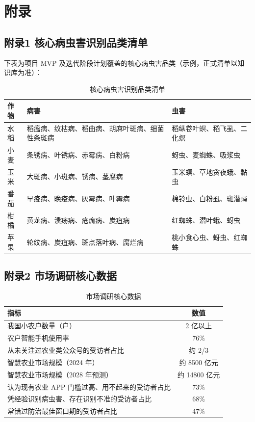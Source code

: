 \chapter*{附录}

\section{附录1 核心病虫害识别品类清单}

下表为项目 MVP 及迭代阶段计划覆盖的核心病虫害品类（示例，正式清单以知识库为准）：

\begin{table}[H]
  \centering
  \small
  \renewcommand{\arraystretch}{1.35}
  \caption{核心病虫害识别品类清单}
  \begin{tabular}{p{2.2cm}p{6.4cm}p{6.4cm}}
    \toprule
    作物 & 病害 & 虫害 \\
    \midrule
    水稻 & 稻瘟病、纹枯病、稻曲病、胡麻叶斑病、细菌性条斑病 & 稻纵卷叶螟、稻飞虱、二化螟 \\
    小麦 & 条锈病、叶锈病、赤霉病、白粉病 & 蚜虫、麦蜘蛛、吸浆虫 \\
    玉米 & 大斑病、小斑病、锈病、茎腐病 & 玉米螟、草地贪夜蛾、黏虫 \\
    番茄 & 早疫病、晚疫病、灰霉病、叶霉病 & 棉铃虫、白粉虱、斑潜蝇 \\
    柑橘 & 黄龙病、溃疡病、疮痂病、炭疽病 & 红蜘蛛、潜叶蛾、蚜虫 \\
    苹果 & 轮纹病、炭疽病、斑点落叶病、腐烂病 & 桃小食心虫、蚜虫、红蜘蛛 \\
    \bottomrule
  \end{tabular}
\end{table}

\section{附录2 市场调研核心数据}

\begin{table}[H]
  \centering
  \small
  \renewcommand{\arraystretch}{1.3}
  \caption{市场调研核心数据}
  \begin{tabular}{p{9.5cm}c}
    \toprule
    指标 & 数值 \\
    \midrule
    我国小农户数量（户） & 2 亿以上 \\
    农户智能手机使用率 & 76\% \\
    从未关注过农业类公众号的受访者占比 & 约 2/3 \\
    智慧农业市场规模（2024 年） & 约 8500 亿元 \\
    智慧农业市场规模（2028 年预测） & 约 14800 亿元 \\
    认为现有农业 APP 门槛过高、用不起来的受访者占比 & 73\% \\
    凭经验识别病虫害、存在识别不准的受访者占比 & 68\% \\
    常错过防治最佳窗口期的受访者占比 & 47\% \\
    \bottomrule
  \end{tabular}
\end{table}

